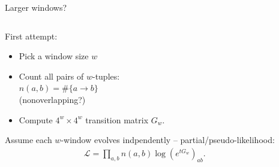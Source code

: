 \documentclass[smaller]{beamer}
\begin{document}
\begin{frame}{Larger windows?}

  \begin{columns}[c]
    \begin{column}{.4\textwidth}

  First attempt:
  \begin{itemize}

    \item Pick a window size $w$

    \item Count all pairs of $w$-tuples: \\
      $n(a,b) = \# \{ a \to b \}$ \\
      {\aside (nonoverlapping?)}

    \item Compute $4^w \times 4^w$ transition matrix $G_w$.

  \end{itemize}

  \vspace{2em}

  Assume each $w$-window evolves indpendently --
  partial/pseudo-likelihood: 
  \begin{align*}
    \mathcal{L} = \prod_{a,b} n(a,b) \log \left( e^{tG_w} \right)_{ab} .
  \end{align*}

    \end{column}
    \begin{column}{.6\textwidth}


\end{column}
\end{columns}
\end{frame}
\end{document}
